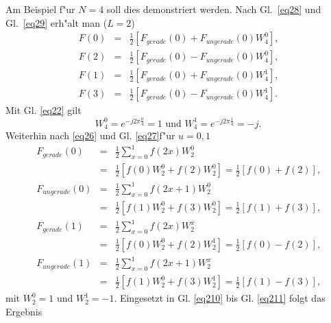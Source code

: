 Am  Beispiel f"ur  $N=4$ soll dies demonstriert werden. Nach  Gl.~\ref{eq28}
und Gl.~\ref{eq29} erh"alt man ($L=2$)
\begin{eqnarray}
\label{eq210}
F(0) &=& \frac{1}{2} \left [ F_{gerade}(0) + F_{ungerade}(0) W_{4}^{0} \right ]
\textrm{,} \\
F(2) &=& \frac{1}{2} \left [ F_{gerade}(0) - F_{ungerade}(0) W_{4}^{0} \right ]
\textrm{,} \\
F(1) &=& \frac{1}{2} \left [ F_{gerade}(0) + F_{ungerade}(0) W_{4}^{1} \right ]
\textrm{,} \\
F(3) &=& \frac{1}{2} \left [ F_{gerade}(0) - F_{ungerade}(0) W_{4}^{1} \right ]
\label{eq211}
\textrm{.}
\end{eqnarray}
Mit Gl. \ref{eq22} gilt
\begin{equation}
  W_{4}^{0} = e^{ -j 2 \pi \frac{0}{4} } = 1
\textrm{ und }
  W_{4}^{1} = e^{ -j 2 \pi \frac{1}{4} } = -j
\textrm{.}
\end{equation}
Weiterhin nach \ref{eq26} und Gl. \ref{eq27}f"ur $u=0,1$
\begin{eqnarray}
F_{gerade}(0) &=& \frac{1}{2} \sum \limits_{x=0}^{1}f(2x) W_{2}^{0}  \nonumber \\
  &=& \frac{1}{2} \left [ f(0)W_{2}^{0} + f(2)W_{2}^{0} \right ]
  = \frac{1}{2} \left [ f(0) + f(2) \right ]
\textrm{,}\\
F_{ungerade}(0) &=& \frac{1}{2} \sum \limits_{x=0}^{1}f(2x+1) W_{2}^{0} \nonumber \\
  &=& \frac{1}{2} \left [ f(1)W_{2}^{0} + f(3)W_{2}^{0} \right ]
  = \frac{1}{2} \left [ f(1) + f(3) \right ]
\textrm{,}\\
F_{gerade}(1) &=& \frac{1}{2} \sum \limits_{x=0}^{1}f(2x) W_{2}^{x} \nonumber \\
  &=& \frac{1}{2} \left [ f(0)W_{2}^{0} + f(2)W_{2}^{1} \right ]
  = \frac{1}{2} \left [ f(0) - f(2) \right ]
\textrm{,}\\
F_{ungerade}(1) &=& \frac{1}{2} \sum \limits_{x=0}^{1}f(2x+1) W_{2}^{x} \nonumber \\
  &=& \frac{1}{2} \left [ f(1)W_{2}^{0} + f(3)W_{2}^{1} \right ]
  = \frac{1}{2} \left [ f(1) - f(3) \right ]
\textrm{,}
\end{eqnarray}
mit $W_{2}^{0} = 1$  und  $W_{2}^{1} = -1$.
Eingesetzt in Gl. \ref{eq210} bis Gl. \ref{eq211} folgt  das Ergebnis
